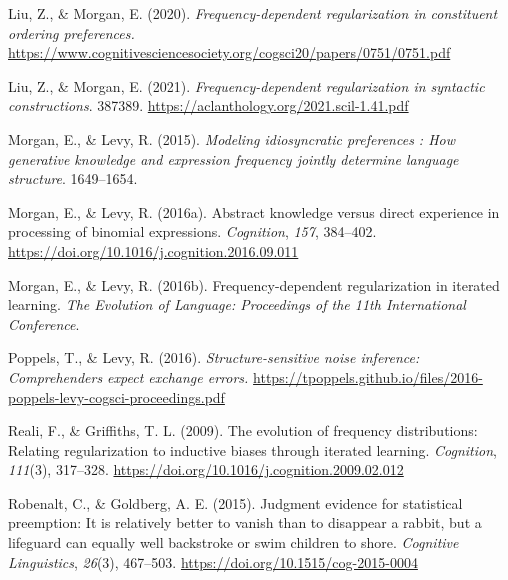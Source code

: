 \documentclass[10pt, letterpaper, hidelinks]{article}
\newenvironment{CSLReferences}%
  {}%
  {\par}
\begin{document}
\begin{CSLReferences}{1}{0}
\leavevmode{}%
Liu, Z., \& Morgan, E. (2020). \emph{Frequency-dependent regularization
in constituent ordering preferences.}
\url{https://www.cognitivesciencesociety.org/cogsci20/papers/0751/0751.pdf}

\leavevmode{}%
Liu, Z., \& Morgan, E. (2021). \emph{Frequency-dependent regularization
in syntactic constructions}. 387389.
\url{https://aclanthology.org/2021.scil-1.41.pdf}

\leavevmode{}%
Morgan, E., \& Levy, R. (2015). \emph{Modeling idiosyncratic preferences
: How generative knowledge and expression frequency jointly determine
language structure}. 1649--1654.

\leavevmode{}%
Morgan, E., \& Levy, R. (2016a). Abstract knowledge versus direct
experience in processing of binomial expressions. \emph{Cognition},
\emph{157}, 384--402.
\url{https://doi.org/10.1016/j.cognition.2016.09.011}

\leavevmode{}%
Morgan, E., \& Levy, R. (2016b). Frequency-dependent regularization in
iterated learning. \emph{The Evolution of Language: Proceedings of the
11th International Conference}.

\leavevmode{}%
Poppels, T., \& Levy, R. (2016). \emph{Structure-sensitive noise
inference: Comprehenders expect exchange errors.}
\url{https://tpoppels.github.io/files/2016-poppels-levy-cogsci-proceedings.pdf}

\leavevmode{}%
Reali, F., \& Griffiths, T. L. (2009). The evolution of frequency
distributions: Relating regularization to inductive biases through
iterated learning. \emph{Cognition}, \emph{111}(3), 317--328.
\url{https://doi.org/10.1016/j.cognition.2009.02.012}

\leavevmode{}%
Robenalt, C., \& Goldberg, A. E. (2015). Judgment evidence for
statistical preemption: It is relatively better to vanish than to
disappear a rabbit, but a lifeguard can equally well backstroke or swim
children to shore. \emph{Cognitive Linguistics}, \emph{26}(3), 467--503.
\url{https://doi.org/10.1515/cog-2015-0004}


\end{CSLReferences}
\end{document}
